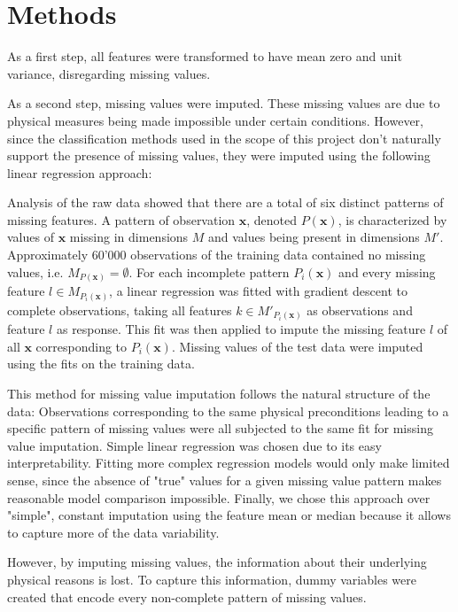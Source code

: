 \documentclass[10pt,conference,compsocconf]{IEEEtran}
\begin{document}
\section*{Methods}
As a first step, all features were transformed to have mean zero and unit variance, disregarding missing values.
\par 
As a second step, missing values were imputed. These missing values are due to physical measures being made impossible under certain conditions. However, since the classification methods used in the scope of this project don't naturally support the presence of missing values, they were imputed using the following linear regression approach: 
\par
Analysis of the raw data showed that there are a total of six distinct patterns of missing features. A pattern of observation $\boldsymbol{x}$, denoted $P(\boldsymbol{x})$, is characterized by values of $\boldsymbol{x}$ missing in dimensions $M$ and values being present in dimensions $M'$. Approximately 60'000 observations of the training data contained no missing values, i.e. $M_{P(\boldsymbol{x})} = \emptyset$. For each incomplete pattern $P_i(\boldsymbol{x})$ and every missing feature $l \in M_{P_i(\boldsymbol{x})}$, a linear regression was fitted with gradient descent to complete observations, taking all features $k \in M'_{P_i(\boldsymbol{x})}$ as observations and feature $l$ as response. This fit was then applied to impute the missing feature $l$ of all $\boldsymbol{x}$ corresponding to $P_i(\boldsymbol{x})$. Missing values of the test data were imputed using the fits on the training data.  
\par
This method for missing value imputation follows the natural structure of the data: Observations corresponding to the same physical preconditions leading to a specific pattern of missing values were all subjected to the same fit for missing value imputation. Simple linear regression was chosen due to its easy interpretability. Fitting more complex regression models would only make limited sense, since the absence of "true" values for a given missing value pattern makes reasonable model comparison impossible. Finally, we chose this approach over "simple", constant imputation using the feature mean or median because it allows to capture more of the data variability. 
\par
However, by imputing missing values, the information about their underlying physical reasons is lost. To capture this information, dummy variables were created that encode every non-complete pattern of missing values. 
\end{document}
